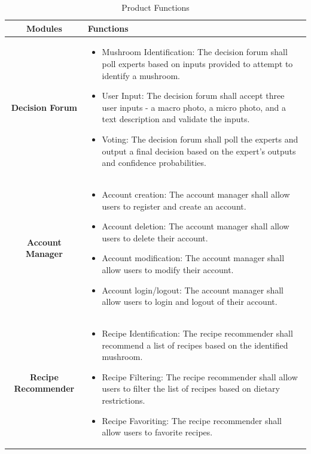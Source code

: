 \documentclass[]{article}
\begin{document}
\begin{table}[H]
	\centering
	
	\label{tab:product_functions}
	\begin{tabular}{|c|p{10cm}|}
		\hline
		\textbf{Modules} & \textbf{Functions} \\
		\hline
		\textbf{Decision Forum} &
		\vspace{-15pt}
		\begin{itemize}
			\item Mushroom Identification: The decision forum shall poll experts based on inputs provided to attempt to identify a mushroom.
			\item User Input: The decision forum shall accept three user inputs - a macro photo, a micro photo, and a text description and validate the inputs.
			\item Voting: The decision forum shall poll the experts and output a final decision based on the expert's outputs and confidence probabilities.
		\end{itemize} \\
		\hline
		\textbf{Account Manager} & 
		\vspace{-15pt}
		\begin{itemize}
			\item Account creation: The account manager shall allow users to register and create an account.
			\item Account deletion: The account manager shall allow users to delete their account.
			\item Account modification: The account manager shall allow users to modify their account.
			\item Account login/logout: The account manager shall allow users to login and logout of their account.
		\end{itemize} \\
		\hline
		\textbf{Recipe Recommender} & 
		\vspace{-15pt}
		\begin{itemize}
			\item Recipe Identification: The recipe recommender shall recommend a list of recipes based on the identified mushroom.
			\item Recipe Filtering: The recipe recommender shall allow users to filter the list of recipes based on dietary restrictions.
			\item Recipe Favoriting: The recipe recommender shall allow users to favorite recipes.
		\end{itemize} \\
		\hline
	\end{tabular}
	\caption{Product Functions}
\end{table}
\end{document}
